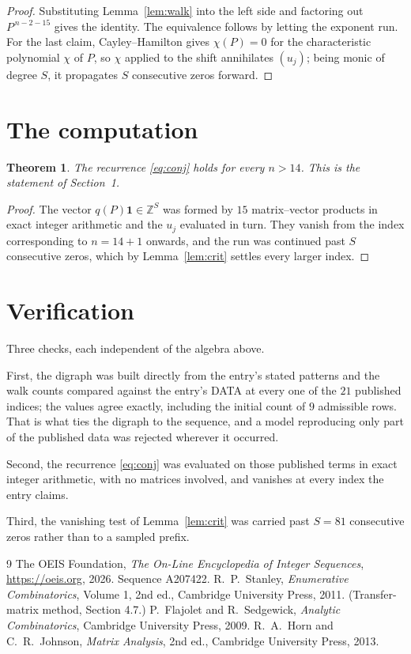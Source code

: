 \documentclass[11pt,a4paper]{article}
\theoremstyle{plain}
\newtheorem{theorem}{Theorem}
\theoremstyle{definition}
\begin{document}
\begin{proof}
Substituting Lemma~\ref{lem:walk} into the left side and factoring out
$P^{\,n-2-15}$ gives the identity. The equivalence follows by letting the exponent
run. For the last claim, Cayley--Hamilton gives $\chi(P)=0$ for the characteristic
polynomial $\chi$ of $P$, so $\chi$ applied to the shift annihilates $(u_j)$; being monic of
degree $S$, it propagates $S$ consecutive zeros forward.
\end{proof}

\section{The computation}

\begin{theorem}
The recurrence \eqref{eq:conj} holds for every $n>14$. This is the statement of
Section~1.
\end{theorem}

\begin{proof}
The vector $q(P)\mathbf{1}\in\mathbb{Z}^{S}$ was formed by $15$ matrix--vector
products in exact integer arithmetic and the $u_j$ evaluated in turn. They vanish from the
index corresponding to $n=14+1$ onwards, and the run was continued past $S$ consecutive
zeros, which by Lemma~\ref{lem:crit} settles every larger index.
\end{proof}

\section{Verification}

Three checks, each independent of the algebra above.

First, the digraph was built directly from the entry's stated patterns and the walk counts
compared against the entry's DATA at every one of the $21$ published indices; the
values agree exactly, including the initial count of $9$ admissible rows. That is
what ties the digraph to the sequence, and a model reproducing only part of the published
data was rejected wherever it occurred.

Second, the recurrence \eqref{eq:conj} was evaluated on those published terms in exact
integer arithmetic, with no matrices involved, and vanishes at every index the entry claims.

Third, the vanishing test of Lemma~\ref{lem:crit} was carried past $S=81$ consecutive
zeros rather than to a sampled prefix.

\begin{thebibliography}{9}
 The OEIS Foundation, \emph{The On-Line Encyclopedia of Integer
Sequences}, \url{https://oeis.org}, 2026. Sequence A207422.
 R.~P.~Stanley, \emph{Enumerative Combinatorics}, Volume 1, 2nd ed.,
Cambridge University Press, 2011. (Transfer-matrix method, Section 4.7.)
 P.~Flajolet and R.~Sedgewick, \emph{Analytic Combinatorics}, Cambridge
University Press, 2009.
 R.~A.~Horn and C.~R.~Johnson, \emph{Matrix Analysis}, 2nd ed., Cambridge
University Press, 2013.
\end{thebibliography}
\end{document}
